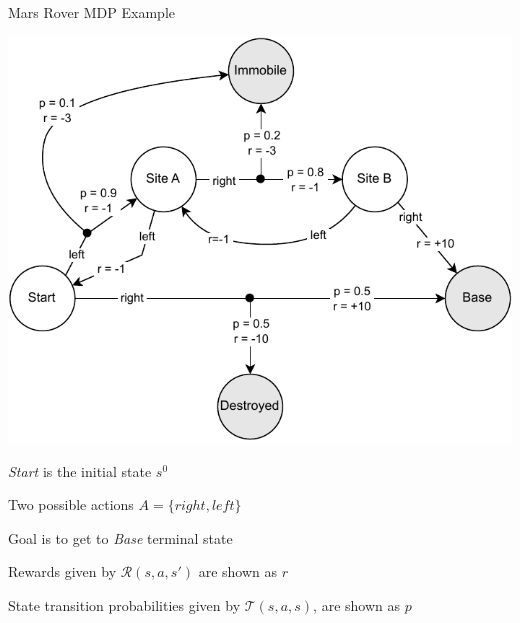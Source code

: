 \begin{frame}[t]{Mars Rover MDP Example}
    \bcol
    
          \includegraphics[width=1\textwidth]{images/chapter_2/mdp-rover.pdf}
    
      \small
        \blist
          \item \textit{Start} is the initial state \(s^0\)
          \item Two possible actions \(A = \{right, left\}\)
          \item Goal is to get to \textit{Base} terminal state
          \item Rewards given by $\mathcal{R}(s, a, s')$ are shown as $r$
          \item State transition probabilities given by $\mathcal{T}(s, a, s)$, are shown as $p$
        \elist
    
    \ecol
\end{frame}

